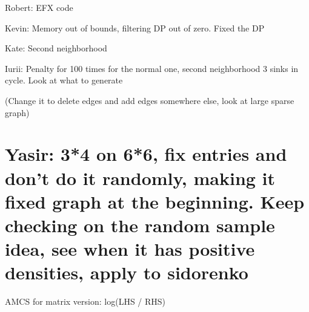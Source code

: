 \documentclass[
  letterpaper,
  DIV=11,
  numbers=noendperiod]{scrartcl}
\begin{document}
Robert: EFX code

Kevin: Memory out of bounds, filtering DP out of zero. Fixed the DP

Kate: Second neighborhood

Iurii: Penalty for 100 times for the normal one, second neighborhood 3
sinks in cycle. Look at what to generate

(Change it to delete edges and add edges somewhere else, look at large
sparse graph)

\section{Yasir: 3*4 on 6*6, fix entries and don't do it randomly, making
it fixed graph at the beginning. Keep checking on the random sample
idea, see when it has positive densities, apply to
sidorenko}\label{yasir-34-on-66-fix-entries-and-dont-do-it-randomly-making-it-fixed-graph-at-the-beginning.-keep-checking-on-the-random-sample-idea-see-when-it-has-positive-densities-apply-to-sidorenko}

AMCS for matrix version: log(LHS / RHS)
\end{document}

